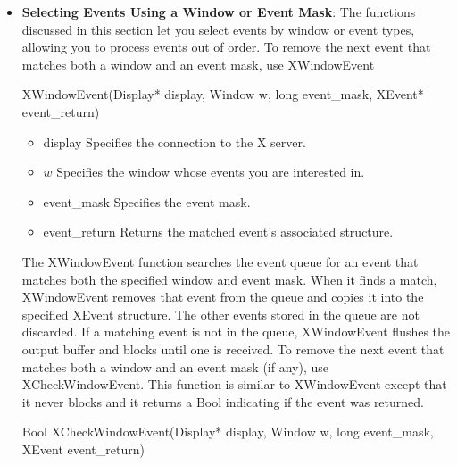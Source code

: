 \documentclass{report}
\begin{document}
\begin{itemize}
\begin{itemize}
            \end{itemize}
            \bigbreak \noindent 
            The XPeekIfEvent function returns only when the specified predicate procedure returns True for an event. After the predicate procedure finds a match, XPeekIfEvent copies the matched event into the client-supplied XEvent structure without removing the event from the queue. XPeekIfEvent flushes the output buffer if it blocks waiting for additional events.
        \item \textbf{Selecting Events Using a Window or Event Mask}: The functions discussed in this section let you select events by window or event types, allowing you to process events out of order.
            \bigbreak \noindent 
            To remove the next event that matches both a window and an event mask, use XWindowEvent
            \bigbreak \noindent 
            \begin{cppcode}
            XWindowEvent(Display* display, Window w, long event_mask, XEvent* event_return)
            \end{cppcode}
            \bigbreak \noindent
            \begin{itemize}
                \item display Specifies the connection to the X server.
                \item $w$ Specifies the window whose events you are interested in.
                \item event\_mask Specifies the event mask.
                \item event\_return Returns the matched event’s associated structure.
            \end{itemize}
            \bigbreak \noindent 
            The XWindowEvent function searches the event queue for an event that matches both the specified window and event mask. When it finds a match, XWindowEvent removes that event from the queue and copies it into the specified XEvent structure. The other events stored in the queue are not discarded. If a matching event is not in the queue, XWindowEvent flushes the output buffer and blocks until one is received.
            \bigbreak \noindent 
            To remove the next event that matches both a window and an event mask (if any), use XCheckWindowEvent. This function is similar to XWindowEvent except that it never blocks and it returns a Bool indicating if the event was returned.
            \bigbreak \noindent 
            \begin{cppcode}
            Bool XCheckWindowEvent(Display* display, Window w, long event_mask, XEvent event_return)

\end{cppcode}
\end{itemize}
\end{document}

